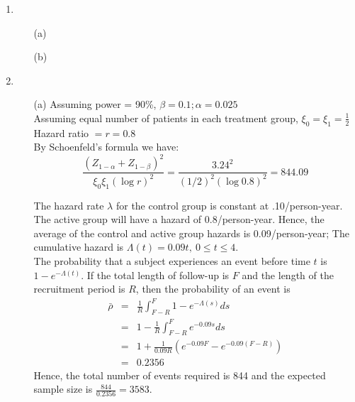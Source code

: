 \documentclass[11pt,a4paper]{article}
\begin{document}
\begin{enumerate}
\item
\begin{enumerate}
\item[(a)] 
\item[(b)] 
\end{enumerate}

\item
\begin{enumerate}
\item[(a)] 
Assuming power = 90\%, $\beta = 0.1; \alpha = 0.025$ \\
Assuming equal number of patients in each treatment group, $\xi_0=\xi_1=\frac{1}{2}$ \\
Hazard ratio $= r = 0.8$ \\
By Schoenfeld’s formula we have:
\[ \dfrac{(Z_{1-\alpha}+Z_{1-\beta})^ 2}{\xi_0\xi_1(\log r)^2} = \dfrac{3.24^ 2}{(1/2)^2(\log 0.8)^2} = 844.09 \]

The hazard rate $\lambda$ for the control group is constant at .10/person-year. The active group will have a hazard of 0.8/person-year. Hence, the average of the control and active group hazards is 0.09/person-year; The cumulative hazard is $\Lambda(t) = 0.09t, \ 0 \leq t \leq 4$. \\
The probability that a subject experiences an event before time $t$ is $1 - e^{-\Lambda(t)}$. If the total length of follow-up is $F$ and the length of the recruitment period is $R$, then the probability of an event is
\begin{eqnarray*}
\bar{\rho} &=& \frac{1}{R} \int_{F - R}^{F} 1 - e^{-\Lambda(s)}ds \\
           &=& 1 - \frac{1}{R} \int_{F - R}^{F} e^{-0.09s} ds \\
           &=& 1 + \frac{1}{0.09R}\left(e^{-0.09F} - e^{-0.09(F - R)} \right) \\
           &=& 0.2356
\end{eqnarray*}
Hence, the total number of events required is 844 and the expected sample size is $\frac{844}{0.2356} = 3583$. 



\end{enumerate}
\end{enumerate}
\end{document}
